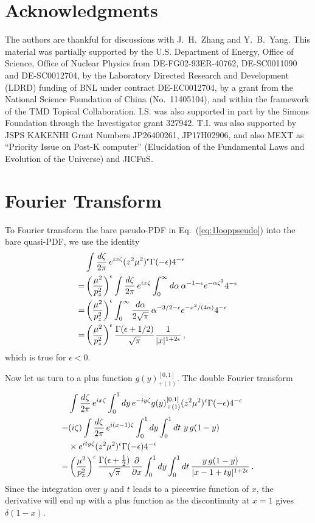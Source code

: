 \section*{Acknowledgments}
The authors are thankful for discussions with J.~H.~Zhang and Y.~B.~Yang. This material was partially supported by the U.S. Department of Energy, Office of Science, Office of Nuclear Physics from DE-FG02-93ER-40762, DE-SC0011090 and DE-SC0012704, by the Laboratory Directed Research and Development (LDRD) funding of BNL under contract DE-EC0012704, by a grant from the National Science Foundation of China (No.~11405104), and within the framework of the TMD Topical Collaboration.
%
I.S. was also supported in part by the Simons Foundation through the Investigator grant 327942.
T.I. was also supported by JSPS KAKENHI Grant Numbers JP26400261, JP17H02906, and also MEXT as ``Priority Issue on Post-K computer'' (Elucidation of the Fundamental Laws and Evolution of the Universe) and JICFuS.


\appendix

\section{Fourier Transform}
\label{sec:ft}

To Fourier transform the bare pseudo-PDF in Eq.~(\ref{eq:1looppseudo}) into the bare quasi-PDF, we use the identity
\begin{align} \label{eq:ft}
&\int {d \zeta \over 2\pi}\, e^{i x \zeta} (z^2\mu^2)^{\epsilon} \Gamma(-\epsilon) 4^{-\epsilon}\\
= & \left({\mu^2\over p_z^2}\right)^\epsilon \int {d \zeta \over 2\pi}\, e^{i x \zeta} \int_0^\infty d\alpha\, \alpha^{-1-\epsilon}e^{-\alpha\zeta^2}4^{-\epsilon}\nonumber\\
=& \left({\mu^2\over p_z^2}\right)^\epsilon \int_0^\infty {d\alpha\over 2\sqrt{\pi}}\, \alpha^{-3/2-\epsilon}e^{-x^2/(4\alpha)}4^{-\epsilon}\nonumber\\
=& \left({\mu^2\over p_z^2}\right)^\epsilon {\Gamma(\epsilon+1/2)\over \sqrt{\pi}} {1\over |x|^{1+2\epsilon}}\,,\nonumber
\end{align}
which is true for $\epsilon<0$.

Now let us turn to a plus function $g(y)^{[0,1]}_{+(1)}$. The double Fourier transform
\begin{align}
& \int {d \zeta \over 2\pi}\, e^{i x \zeta} \int_0^1 dy\, e^{-iy\zeta} g(y)^{[0,1]}_{+(1)} (z^2\mu^2)^{\epsilon} \Gamma(-\epsilon) 4^{-\epsilon}\nonumber\\
= &(i\zeta)\int {d \zeta \over 2\pi}\, e^{i (x-1) \zeta} \int_0^1 dy \int_0^1 dt\ y\,g(1-y)\nonumber\\
&\times e^{ity\zeta} (z^2\mu^2)^{\epsilon} \Gamma(-\epsilon) 4^{-\epsilon} \nonumber\\
=& \left({\mu^2\over p_z^2}\right)^\epsilon {\Gamma(\epsilon+{1\over2})\over \sqrt{\pi}}{\partial\over \partial x} \int_0^1 dy \int_0^1 dt \, {y\,g(1-y) \over |x-1+ty|^{1+2\epsilon}}\,.
\end{align}
Since the integration over $y$ and $t$ leads to a piecewise function of $x$, the derivative will end up with a plus function as the discontinuity at $x=1$ gives $\delta(1-x)$.


